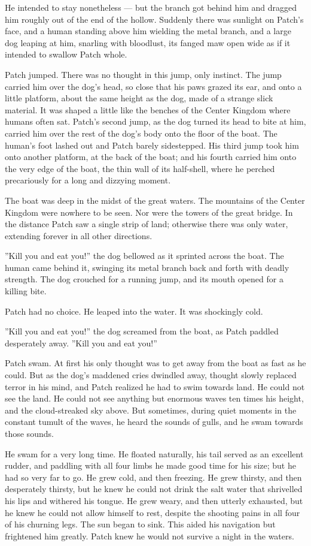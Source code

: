 \documentclass[12pt]{book}
\begin{document}
He intended to stay nonetheless --- but the branch got behind him and
dragged him roughly out of the end of the hollow. Suddenly there was
sunlight on Patch's face, and a human standing above him wielding the
metal branch, and a large dog leaping at him, snarling with bloodlust,
its fanged maw open wide as if it intended to swallow Patch whole.

Patch jumped. There was no thought in this jump, only instinct. The
jump carried him over the dog's head, so close that his paws grazed
its ear, and onto a little platform, about the same height as the dog,
made of a strange slick material. It was shaped a little like the
benches of the Center Kingdom where humans often sat. Patch's second
jump, as the dog turned its head to bite at him, carried him over the
rest of the dog's body onto the floor of the boat. The human's foot
lashed out and Patch barely sidestepped. His third jump took him onto
another platform, at the back of the boat; and his fourth carried him
onto the very edge of the boat, the thin wall of its half-shell, where
he perched precariously for a long and dizzying moment.

The boat was deep in the midst of the great waters. The mountains of
the Center Kingdom were nowhere to be seen. Nor were the towers of the
great bridge. In the distance Patch saw a single strip of land;
otherwise there was only water, extending forever in all other
directions.

''Kill you and eat you!'' the dog bellowed as it sprinted across the
boat. The human came behind it, swinging its metal branch back and
forth with deadly strength. The dog crouched for a running jump, and
its mouth opened for a killing bite.

Patch had no choice. He leaped into the water. It was shockingly cold.

''Kill you and eat you!'' the dog screamed from the boat, as Patch
paddled desperately away. ''Kill you and eat you!''

Patch swam. At first his only thought was to get away from the boat as
fast as he could. But as the dog's maddened cries dwindled away,
thought slowly replaced terror in his mind, and Patch realized he had
to swim towards land. He could not see the land. He could not see
anything but enormous waves ten times his height, and the
cloud-streaked sky above. But sometimes, during quiet moments in the
constant tumult of the waves, he heard the sounds of gulls, and he
swam towards those sounds.

He swam for a very long time. He floated naturally, his tail served as
an excellent rudder, and paddling with all four limbs he made good
time for his size; but he had so very far to go. He grew cold, and
then freezing. He grew thirsty, and then desperately thirsty, but he
knew he could not drink the salt water that shrivelled his lips and
withered his tongue. He grew weary, and then utterly exhausted, but he
knew he could not allow himself to rest, despite the shooting pains in
all four of his churning legs. The sun began to sink. This aided his
navigation but frightened him greatly. Patch knew he would not survive
a night in the waters.
\end{document}
